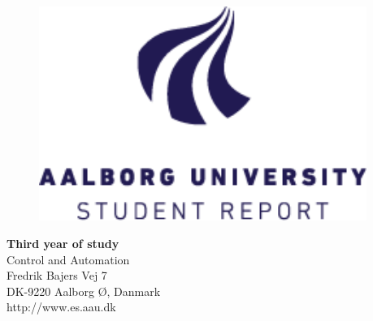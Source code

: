 {}
\thispagestyle{empty}

\begin{minipage}[t]{0.48\textwidth}
\vspace*{-25pt}			%

\begin{figure}[H] 
\includegraphics[trim=0cm 0cm 0cm 0cm,clip,width=0.95\textwidth]{report/introduction/aau_logo1}
\end{figure} 
\end{minipage}
\hfill
\begin{minipage}[t]{0.48\textwidth}
{\small 
\textbf{Third year of study} \\
Control and Automation \\
Fredrik Bajers Vej 7 \\
DK-9220 Aalborg Ø, Danmark\\
http://www.es.aau.dk}
\end{minipage}

\vspace*{1cm}

